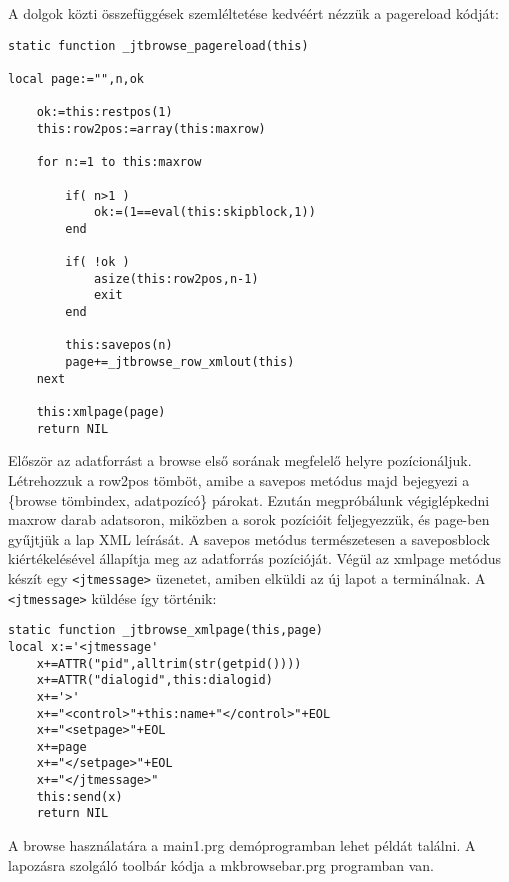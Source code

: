 A dolgok közti összefüggések szemléltetése kedvéért 
nézzük a pagereload kódját: 

\begin{verbatim}
static function _jtbrowse_pagereload(this) 

local page:="",n,ok
 
    ok:=this:restpos(1)  
    this:row2pos:=array(this:maxrow) 

    for n:=1 to this:maxrow
  
        if( n>1 )
            ok:=(1==eval(this:skipblock,1))
        end

        if( !ok )
            asize(this:row2pos,n-1)
            exit
        end

        this:savepos(n)
        page+=_jtbrowse_row_xmlout(this)
    next

    this:xmlpage(page)
    return NIL
\end{verbatim}

Először az adatforrást a browse első sorának megfelelő helyre
pozícionáljuk. Létrehozzuk a row2pos tömböt, amibe a savepos
metódus majd bejegyezi a \{browse tömbindex, adatpozícó\}
párokat. Ezután megpróbálunk végiglépkedni maxrow darab 
adatsoron, miközben a sorok pozícióit feljegyezzük,
és page-ben gyűjtjük a lap XML leírását. A savepos metódus
természetesen a saveposblock kiértékelésével állapítja meg
az adatforrás pozícióját. Végül az xmlpage metódus készít
egy \verb!<jtmessage>! üzenetet, amiben elküldi az új lapot
a terminálnak. A \verb!<jtmessage>! küldése így történik:
\begin{verbatim}
static function _jtbrowse_xmlpage(this,page)
local x:='<jtmessage'
    x+=ATTR("pid",alltrim(str(getpid())))
    x+=ATTR("dialogid",this:dialogid)
    x+='>'
    x+="<control>"+this:name+"</control>"+EOL
    x+="<setpage>"+EOL
    x+=page
    x+="</setpage>"+EOL
    x+="</jtmessage>"
    this:send(x)
    return NIL
\end{verbatim}
 
A browse használatára a main1.prg demóprogramban lehet példát
találni. A lapozásra szolgáló toolbár kódja a mkbrowsebar.prg
programban van.


 
